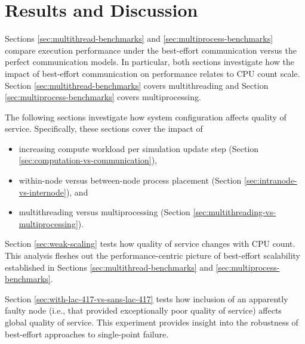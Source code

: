\section{Results and Discussion}

Sections \ref{sec:multithread-benchmarks} and \ref{sec:multiprocess-benchmarks} compare execution performance under the best-effort communication versus the perfect communication models.
In particular, both sections investigate how the impact of best-effort communication on performance relates to CPU count scale.
Section \ref{sec:multithread-benchmarks} covers multithreading and Section \ref{sec:multiprocess-benchmarks} covers multiprocessing.

The following sections investigate how system configuration affects quality of service.
Specifically, these sections cover the impact of
\begin{itemize}
  \item increasing compute workload per simulation update step (Section \ref{sec:computation-vs-communication}),
  \item within-node versus between-node process placement (Section \ref{sec:intranode-vs-internode}), and
  \item multithreading versus multiprocessing (Section \ref{sec:multithreading-vs-multiprocessing}).
\end{itemize}

Section \ref{sec:weak-scaling} tests how quality of service changes with CPU count.
This analysis fleshes out the performance-centric picture of best-effort scalability established in Sections \ref{sec:multithread-benchmarks} and \ref{sec:multiprocess-benchmarks}.

Section \ref{sec:with-lac-417-vs-sans-lac-417} tests how inclusion of an apparently faulty node (i.e., that provided exceptionally poor quality of service) affects global quality of service.
This experiment provides insight into the robustness of best-effort approaches to single-point failure.















